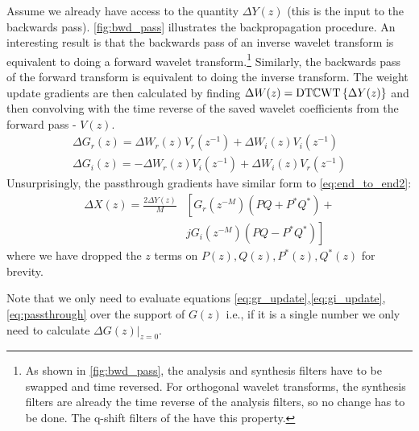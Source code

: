 Assume we already have access to the quantity $\Delta Y(z)$ (this is the input
to the backwards pass). \autoref{fig:bwd_pass} illustrates the backpropagation procedure. An
interesting result is that the backwards pass of an inverse wavelet transform is equivalent to doing
a forward wavelet transform.\footnote{As shown in \autoref{fig:bwd_pass}, the analysis and synthesis
  filters have to be swapped and time reversed. For orthogonal wavelet transforms, the synthesis
  filters are already the time reverse of the analysis filters, so no change has to be done. The q-shift filters of the
\DTCWT \cite{kingsbury_design_2003} have this property.} Similarly, the backwards pass of the forward transform is equivalent to
doing the inverse transform. The weight update gradients are then calculated by finding $\Delta W(z)
= {\mathrm{DT}{\mathbb{C}}\mathrm{WT}}\left\{ \Delta Y(z) \right\}$ and then convolving with the time reverse of the saved wavelet coefficients from
the forward pass - $V(z)$.
\begin{gather}
  \Delta G_r(z) = \Delta W_r(z) V_r(z^{-1}) + \Delta W_i(z) V_i(z^{-1})  \label{eq:gr_update}\\
  \Delta G_i(z) =  -\Delta W_r(z) V_i(z^{-1}) + \Delta W_i(z) V_r(z^{-1})  \label{eq:gi_update} 
\end{gather}
Unsurprisingly, the passthrough gradients have similar form to \autoref{eq:end_to_end2}:
\begin{equation}\label{eq:passthrough}
  \begin{split}
    \Delta X(z) = \frac{2\Delta Y(z)}{M} & \left[G_r(z^{-M})\left( PQ + P^*Q^* \right)\right. + \\
      & \left. jG_i(z^{-M}) \left(PQ-P^*Q^* \right) \right] 
\end{split}
\end{equation}
where we have dropped the $z$ terms on $P(z), Q(z), P^*(z), Q^*(z)$ for brevity.

Note that we only need to evaluate equations
\ref{eq:gr_update},\ref{eq:gi_update},\ref{eq:passthrough} over the support of $G(z)$ 
i.e., if it is a single number we only need to calculate $\left.\Delta G(z)\right\rvert_{z=0}$.

